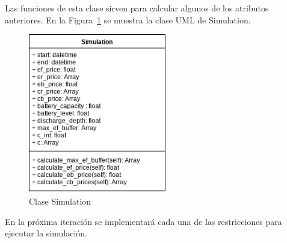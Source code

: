 \begin{itemize}
Las funciones de esta clase sirven para calcular algunos de los atributos anteriores. En la Figura~\ref{fig:simulation} se muestra la clase UML de Simulation.
\end{itemize}

\begin{figure}[H]
        \centering
        \includegraphics[width=6cm]{figs/simulation_class.png}
        \caption{Clase Simulation}
        \label{fig:simulation}
\end{figure}

En la próxima iteración se implementará cada una de las restricciones para ejecutar la simulación.
